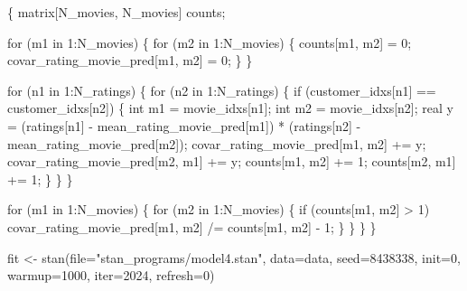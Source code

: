 \documentclass[
  letterpaper,
  DIV=11,
  numbers=noendperiod]{scrartcl}
\newenvironment{Shaded}{\begin{snugshade}}{\end{snugshade}}
\newcommand{\AttributeTok}[1]{\textcolor[rgb]{0.40,0.45,0.13}{#1}}
\newcommand{\ControlFlowTok}[1]{\textcolor[rgb]{0.00,0.23,0.31}{#1}}
\newcommand{\DataTypeTok}[1]{\textcolor[rgb]{0.68,0.00,0.00}{#1}}
\newcommand{\DecValTok}[1]{\textcolor[rgb]{0.68,0.00,0.00}{#1}}
\newcommand{\FunctionTok}[1]{\textcolor[rgb]{0.28,0.35,0.67}{#1}}
\newcommand{\NormalTok}[1]{\textcolor[rgb]{0.00,0.23,0.31}{#1}}
\newcommand{\OtherTok}[1]{\textcolor[rgb]{0.00,0.23,0.31}{#1}}
\newcommand{\StringTok}[1]{\textcolor[rgb]{0.13,0.47,0.30}{#1}}
\begin{document}
\begin{codelisting}
\begin{Shaded}
\begin{Highlighting}[]
\NormalTok{  \{}
    \DataTypeTok{matrix}\NormalTok{[N\_movies, N\_movies] counts;}

    \ControlFlowTok{for}\NormalTok{ (m1 }\ControlFlowTok{in} \DecValTok{1}\NormalTok{:N\_movies) \{}
      \ControlFlowTok{for}\NormalTok{ (m2 }\ControlFlowTok{in} \DecValTok{1}\NormalTok{:N\_movies) \{}
\NormalTok{        counts[m1, m2] = }\DecValTok{0}\NormalTok{;}
\NormalTok{        covar\_rating\_movie\_pred[m1, m2] = }\DecValTok{0}\NormalTok{;}
\NormalTok{      \}}
\NormalTok{    \}}

    \ControlFlowTok{for}\NormalTok{ (n1 }\ControlFlowTok{in} \DecValTok{1}\NormalTok{:N\_ratings) \{}
      \ControlFlowTok{for}\NormalTok{ (n2 }\ControlFlowTok{in} \DecValTok{1}\NormalTok{:N\_ratings) \{}
        \ControlFlowTok{if}\NormalTok{ (customer\_idxs[n1] == customer\_idxs[n2]) \{}
          \DataTypeTok{int}\NormalTok{ m1 = movie\_idxs[n1];}
          \DataTypeTok{int}\NormalTok{ m2 = movie\_idxs[n2];}
          \DataTypeTok{real}\NormalTok{ y =   (ratings[n1] {-} mean\_rating\_movie\_pred[m1])}
\NormalTok{                   * (ratings[n2] {-} mean\_rating\_movie\_pred[m2]);}
\NormalTok{          covar\_rating\_movie\_pred[m1, m2] += y;}
\NormalTok{          covar\_rating\_movie\_pred[m2, m1] += y;}
\NormalTok{          counts[m1, m2] += }\DecValTok{1}\NormalTok{;}
\NormalTok{          counts[m2, m1] += }\DecValTok{1}\NormalTok{;}
\NormalTok{        \}}
\NormalTok{      \}}
\NormalTok{    \}}

    \ControlFlowTok{for}\NormalTok{ (m1 }\ControlFlowTok{in} \DecValTok{1}\NormalTok{:N\_movies) \{}
      \ControlFlowTok{for}\NormalTok{ (m2 }\ControlFlowTok{in} \DecValTok{1}\NormalTok{:N\_movies) \{}
        \ControlFlowTok{if}\NormalTok{ (counts[m1, m2] \textgreater{} }\DecValTok{1}\NormalTok{)}
\NormalTok{          covar\_rating\_movie\_pred[m1, m2] /= counts[m1, m2] {-} }\DecValTok{1}\NormalTok{;}
\NormalTok{      \}}
\NormalTok{    \}}
\NormalTok{  \}}
\NormalTok{\}}
\end{Highlighting}
\end{Shaded}

\end{codelisting}

\begin{Shaded}
\begin{Highlighting}[]
\NormalTok{fit }\OtherTok{\textless{}{-}} \FunctionTok{stan}\NormalTok{(}\AttributeTok{file=}\StringTok{"stan\_programs/model4.stan"}\NormalTok{,}
            \AttributeTok{data=}\NormalTok{data, }\AttributeTok{seed=}\DecValTok{8438338}\NormalTok{, }\AttributeTok{init=}\DecValTok{0}\NormalTok{,}
            \AttributeTok{warmup=}\DecValTok{1000}\NormalTok{, }\AttributeTok{iter=}\DecValTok{2024}\NormalTok{, }\AttributeTok{refresh=}\DecValTok{0}\NormalTok{)}
\end{Highlighting}
\end{Shaded}
\end{document}

